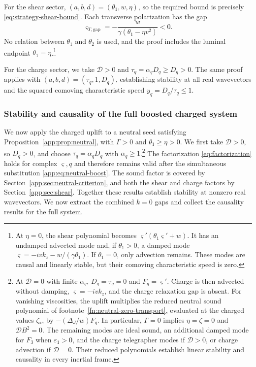For the shear sector, $(a,b,d)=(\theta_1,w,\eta)$, so the required
bound is precisely \eqref{eq:strategy-shear-bound}. Each transverse
polarization has the gap
\begin{equation}\label{app:eq:shear-boosted-gap}
 \varsigma_{T,\mathrm{gap}}=-\frac{w}{\gamma(\theta_1-\eta v^2)}<0.
\end{equation}
No relation between $\theta_1$ and $\theta_2$ is used, and the proof
includes the luminal endpoint $\theta_1=\eta$.\footnote{\label{fn:shear-zero-transport}At
$\eta=0$, the shear polynomial becomes
$\varsigma'(\theta_1\varsigma'+w)$. It has an undamped advected mode
and, if $\theta_1>0$, a damped mode
$\varsigma=-ivk_z-w/(\gamma\theta_1)$.
If $\theta_1=0$, only advection remains. These modes are causal and
linearly stable, but their comoving characteristic speed is zero.}


For the charge sector, we take $\mathcal D>0$ and
$\tau_q=\alpha_qD_q\geq D_q>0$. The same proof applies with
$(a,b,d)=(\tau_q,1,D_q)$, establishing stability at all real
wavevectors and the squared comoving characteristic speed
$y_q=D_q/\tau_q\leq1$.

\subsubsection{Stability and causality of the full boosted charged system}
\label{app:sec:charged-boost-proof}\label{app:sec:charged-numbered}
We now apply the charged uplift to a neutral seed satisfying
Proposition~\ref{app:prop:neutral}, with $\Gamma>0$ and
$\theta_1\geq\eta>0$. We first take $\mathcal D>0$, so
$D_q>0$, and choose $\tau_q=\alpha_qD_q$ with
$\alpha_q\geq1$.\footnote{\label{fn:charged-zero-transport}At
$\mathcal D=0$ with finite $\alpha_q$, $D_q=\tau_q=0$ and
$F_q=\varsigma'$. Charge is then advected without damping,
$\varsigma=-ivk_z$, and the charge relaxation gap is absent.
For vanishing viscosities, the uplift multiplies the reduced neutral
sound polynomial of footnote~\ref{fn:neutral-zero-transport}, evaluated
at the charged values $\zeta_*$, by $-(\Delta_J/w)F_q$.
In particular, $\Gamma=0$ implies
$\eta=\zeta=0$ and $\mathcal D B^2=0$. The remaining modes are ideal sound, an additional damped mode for \(F_3\) when \(\varepsilon_1>0\), and the charge
telegrapher modes if $\mathcal D>0$, or charge advection if
$\mathcal D=0$. Their reduced polynomials establish linear stability
and causality in every inertial frame.}
The factorization \eqref{eq:factorization} holds for complex
$\varsigma,q$ and therefore remains valid after the simultaneous
substitution \eqref{app:eq:neutral-boost}. The sound factor is covered
by Section~\ref{app:sec:neutral-criterion}, and both the shear and charge
factors by Section~\ref{app:sec:shear}. Together these results establish
stability at nonzero real wavevectors. We now extract the combined
$k=0$ gaps and collect the causality results for the full system.

